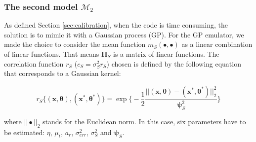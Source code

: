 \documentclass[soumission]{jsfds}
\edef\hc{\string: }
\begin{document}


\subsubsection{The second model $\mathcal{M}_2$}

As defined Section \ref{sec:calibration}, when the code is time consuming, the solution is to mimic it with a Gaussian process (GP). For the GP emulator, we made the choice to consider the mean function $m_S(\bullet,\bullet)$ as a linear combination of linear functions. That means $\textbf{H}_S$ is a matrix of linear functions. The correlation function $r_S$ ($c_S=\sigma_S^2r_S$) chosen is defined by the following equation that corresponds to a Gaussian kernel:




\begin{equation}
r_S\{(\boldsymbol{x},\boldsymbol{\theta}),(\boldsymbol{x}^*,\boldsymbol{\theta}^*)\}= \exp\Big\{-\frac{1}{2}\frac{||(\boldsymbol{x},\boldsymbol{\theta})-(\boldsymbol{x}^*,\boldsymbol{\theta}^*)||_2^2}{\boldsymbol{\psi}_S^2}\Big\}
\label{eq:GaussianKer}
\end{equation}

where $||\bullet||_2$ stands for the Euclidean norm.\newline
In this case, six parameters have to be estimated\hc $\eta$, $\mu_t$, $a_r$, $\sigma_{err}^2$, $\sigma_S^2$ and $\boldsymbol{\psi}_S$. \newline
\end{document}
